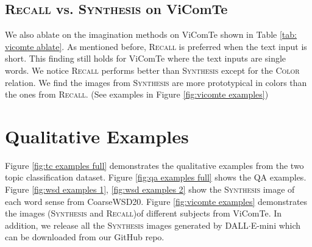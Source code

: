 \documentclass[11pt]{article}
\newcommand{\model}{Z-LaVI}
\begin{document}
\subsection{\textsc{Recall} vs. \textsc{Synthesis} on ViComTe}
We also ablate on the imagination methods on ViComTe shown in Table \ref{tab: vicomte ablate}. As mentioned before, \textsc{Recall} is preferred when the text input is short. This finding still holds for ViComTe where the text inputs are single words. We notice \textsc{Recall} performs better than \textsc{Synthesis} except for the \textsc{Color} relation. We find the images from \textsc{Synthesis} are more prototypical in colors than the ones from \textsc{Recall}. (See examples in Figure \ref{fig:vicomte examples})
\begin{table}[!htbp]
\centering
{}
\caption{The average Spearman correlation (left) and top-1 accuracy (right) of \model~w/o LM with different imagination methods. The highest number of each row is \textbf{bolded} and the second-best one is \underline{underlined}.}
\label{tab: vicomte ablate}
\end{table} 

\section{Qualitative Examples} \label{appendix: qual examples}
Figure \ref{fig:tc examples full} demonstrates the qualitative examples from the two topic classification dataset. Figure \ref{fig:qa examples full} shows the QA examples. Figure \ref{fig:wsd examples 1}, \ref{fig:wsd examples 2} show the \textsc{Synthesis} image of each word sense from CoarseWSD20. Figure \ref{fig:vicomte examples} demonstrates the images (\textsc{Synthesis} and \textsc{Recall})of different subjects from ViComTe. In addition, we release all the \textsc{Synthesis} images generated by DALL$\cdot$E-mini which can be downloaded from our GitHub repo.
\end{document}
